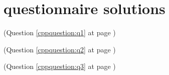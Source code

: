 \chapter{\CC questionnaire solutions}

\begin{cppanswer}
    \label{cppquestion:s1}
    (Question \ref{cppquestion:q1} at page \pageref{cppquestion:q1}) \hfill \\

\end{cppanswer}

\begin{cppanswer}
    \label{cppquestion:s2}
    (Question \ref{cppquestion:q2} at page \pageref{cppquestion:q2}) \hfill \\
    
\end{cppanswer}

\begin{cppanswer}
    \label{cppquestion:s3}
    (Question \ref{cppquestion:q3} at page \pageref{cppquestion:q3}) \hfill \\

\end{cppanswer}